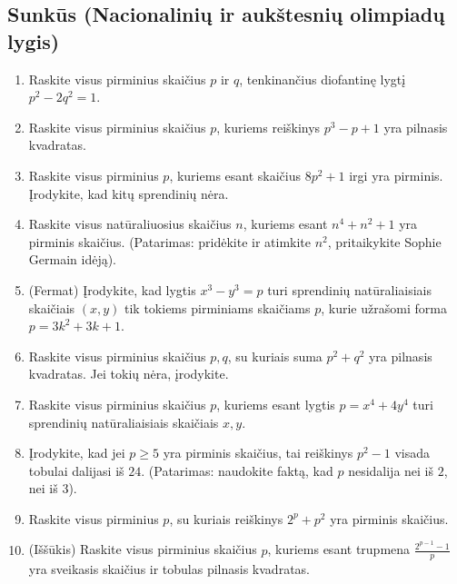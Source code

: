 \documentclass[11pt,a4paper]{scrartcl}
\begin{document}
\subsection*{Sunkūs (Nacionalinių ir aukštesnių olimpiadų lygis)}
\setcounter{enumi}{20}
\begin{enumerate}
    \item Raskite visus pirminius skaičius $p$ ir $q$, tenkinančius diofantinę lygtį $p^2 - 2q^2 = 1$.
    \item Raskite visus pirminius skaičius $p$, kuriems reiškinys $p^3 - p + 1$ yra pilnasis kvadratas.
    \item Raskite visus pirminius $p$, kuriems esant skaičius $8p^2 + 1$ irgi yra pirminis. Įrodykite, kad kitų sprendinių nėra.
    \item Raskite visus natūraliuosius skaičius $n$, kuriems esant $n^4 + n^2 + 1$ yra pirminis skaičius. (Patarimas: pridėkite ir atimkite $n^2$, pritaikykite Sophie Germain idėją).
    \item (Fermat) Įrodykite, kad lygtis $x^3 - y^3 = p$ turi sprendinių natūraliaisiais skaičiais $(x, y)$ tik tokiems pirminiams skaičiams $p$, kurie užrašomi forma $p = 3k^2 + 3k + 1$.
    \item Raskite visus pirminius skaičius $p, q$, su kuriais suma $p^2 + q^2$ yra pilnasis kvadratas. Jei tokių nėra, įrodykite.
    \item Raskite visus pirminius skaičius $p$, kuriems esant lygtis $p = x^4 + 4y^4$ turi sprendinių natūraliaisiais skaičiais $x, y$.
    \item Įrodykite, kad jei $p \ge 5$ yra pirminis skaičius, tai reiškinys $p^2 - 1$ visada tobulai dalijasi iš $24$. (Patarimas: naudokite faktą, kad $p$ nesidalija nei iš $2$, nei iš $3$).
    \item Raskite visus pirminius $p$, su kuriais reiškinys $2^p + p^2$ yra pirminis skaičius.
    \item (Iššūkis) Raskite visus pirminius skaičius $p$, kuriems esant trupmena $\frac{2^{p-1}-1}{p}$ yra sveikasis skaičius ir tobulas pilnasis kvadratas.
\end{enumerate}
\end{document}
